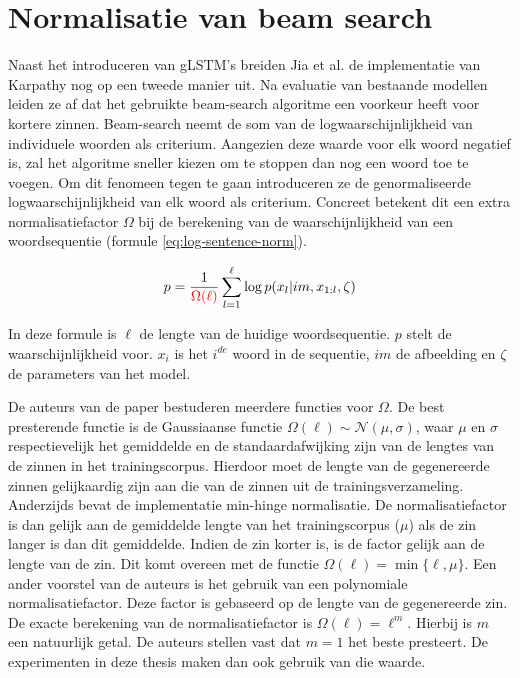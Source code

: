 \section{Normalisatie van beam search}
Naast het introduceren van gLSTM's breiden Jia et al.\cite{Fernando2015} de implementatie van Karpathy nog op een tweede manier uit. Na evaluatie van bestaande modellen leiden ze af dat het gebruikte beam-search algoritme een voorkeur heeft voor kortere zinnen. Beam-search neemt de som van de logwaarschijnlijkheid van individuele woorden als criterium. Aangezien deze waarde voor elk woord negatief is, zal het algoritme sneller kiezen om te stoppen dan nog een woord toe te voegen. Om dit fenomeen tegen te gaan introduceren ze de genormaliseerde logwaarschijnlijkheid van elk woord als criterium. Concreet betekent dit een extra normalisatiefactor $\Omega$ bij de berekening van de waarschijnlijkheid van een woordsequentie (formule \eqref{eq:log-sentence-norm}).

\begin{equation}
p = \frac{1}{\color{red}{\Omega(\ell)}}\sum_{l=1}^{\ell} \log p(x_l | im, x_{1:l}, \zeta)
\label{eq:log-sentence-norm}
\end{equation}

In deze formule is $\ell$ de lengte van de huidige woordsequentie. $p$ stelt de waarschijnlijkheid voor. $x_i$ is het $i^{de}$ woord in de sequentie, $im$ de afbeelding en $\zeta$ de parameters van het model. 

De auteurs van de paper bestuderen meerdere functies voor $\Omega$. 
De best presterende functie is de Gaussiaanse functie $\Omega(\ell) \sim \mathcal{N}(\mu, \sigma)$, waar $\mu$ en $\sigma$ respectievelijk het gemiddelde en de standaardafwijking zijn van de lengtes van de zinnen in het trainingscorpus. Hierdoor moet de lengte van de gegenereerde zinnen gelijkaardig zijn aan die van de zinnen uit de trainingsverzameling. 
Anderzijds bevat de implementatie min-hinge normalisatie. De normalisatiefactor is dan gelijk aan de gemiddelde lengte van het trainingscorpus ($\mu$) als de zin langer is dan dit gemiddelde. Indien de zin korter is, is de factor gelijk aan de lengte van de zin. Dit komt overeen met de functie $\Omega(\ell)=\min\{\ell, \mu\}$.
Een ander voorstel van de auteurs is het gebruik van een polynomiale normalisatiefactor. Deze factor is gebaseerd op de lengte van de gegenereerde zin. De exacte berekening van de normalisatiefactor is $\Omega(\ell) = \ell^m$. Hierbij is $m$ een natuurlijk getal. De auteurs stellen vast dat $m=1$ het beste presteert. De experimenten in deze thesis maken dan ook gebruik van die waarde.

